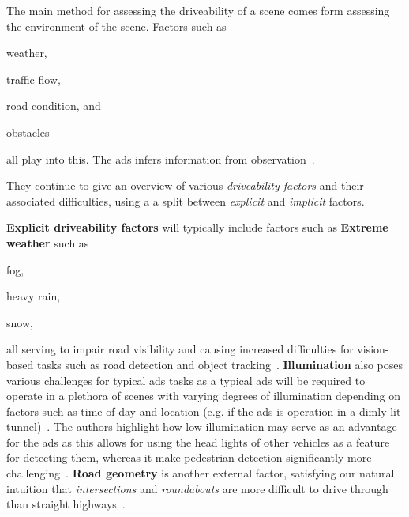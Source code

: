 The main method for assessing the driveability of a scene comes form assessing the environment of
the scene. Factors such as \begin{inparaenum}
    \item weather,
    \item traffic flow,
    \item road condition, and
    \item obstacles \end{inparaenum} all play into this. The \acrshort{ads} infers information from
observation~\cite[3136]{safeToDrive}.

They continue to give an overview of various \textit{driveability factors} and their associated
difficulties, using a a split between \textit{explicit} and \textit{implicit} factors.

\textbf{Explicit driveability factors} will typically include factors such as \textbf{Extreme
    weather} such as \begin{inparaenum}
    \item fog,
    \item heavy rain,
    \item snow,
\end{inparaenum}
all serving to impair road visibility and causing increased difficulties for vision-based tasks such
as road detection and object tracking~\cite[3136-3137]{safeToDrive}. \textbf{Illumination} also
poses various challenges for typical \acrshort{ads} tasks as a typical \acrshort{ads} will be
required to operate in a plethora of scenes with varying degrees of illumination depending on
factors such as time of day and location (e.g. if the \acrshort{ads} is operation in a dimly lit
tunnel)~\cite[3137]{safeToDrive}. The authors highlight how low illumination may serve as an
advantage for the \acrshort{ads} as this allows for using the head lights of other vehicles as a
feature for detecting them, whereas it make pedestrian detection significantly more
challenging~\cite[3137]{safeToDrive}. \textbf{Road geometry} is another external factor, satisfying
our natural intuition that \textit{intersections} and \textit{roundabouts} are more difficult to
drive through than straight highways~\cite[3137]{safeToDrive}.

